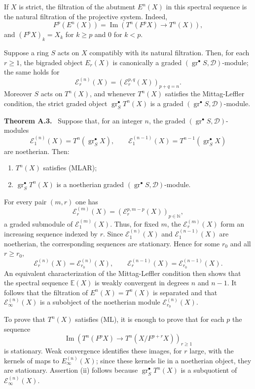 \documentclass[12pt]{article}
\newcommand{\bN}{\mathbb N}
\newcommand{\cD}{\mathcal D}
\newcommand{\cE}{\mathcal E}
\newcommand{\Imn}{\operatorname{Im}}
\newcommand{\gr}{\operatorname{gr}}
\newenvironment{statement}[1]{\par\medskip\noindent\textbf{#1.}\ }{\par\medskip}
\begin{document}
If $X$ is strict, the filtration of the abutment $E^n(X)$ in this spectral sequence
is the natural filtration of the projective system. Indeed,
\[
 F^p(E^n(X))=\Imn(T^n(F^pX)\to T^n(X)),
\]
and $(F^pX)_k=X_k$ for $k\ge p$ and $0$ for $k<p$.

Suppose a ring $S$ acts on $X$ compatibly with its natural filtration. Then, for each
$r\ge1$, the bigraded object $E_r(X)$ is canonically a graded
$(\gr^\bullet S,\cD)$-module; the same holds for
\[
       \cE_r^{(n)}(X)=(\cE_r^{p,q}(X))_{p+q=n}.
\]
Moreover $S$ acts on $T^n(X)$, and whenever $T^n(X)$ satisfies the Mittag-Leffler
condition, the strict graded object $\gr_S^\bullet T^n(X)$ is a graded
$(\gr^\bullet S,\cD)$-module.

\begin{statement}{Theorem A.3}
Suppose that, for an integer $n$, the graded $(\gr^\bullet S,\cD)$-modules
\[
      \cE_1^{(n)}(X)=T^n(\gr_S^\bullet X),
      \qquad
      \cE_1^{(n-1)}(X)=T^{n-1}(\gr_S^\bullet X)
\]
are noetherian. Then:
\begin{enumerate}[label=(\roman*)]
\item $T^n(X)$ satisfies (MLAR);
\item $\gr_S^\bullet T^n(X)$ is a noetherian graded
$(\gr^\bullet S,\cD)$-module.
\end{enumerate}
\end{statement}

For every pair $(m,r)$ one has
\[
      \cE_r^{(m)}(X)=(\cE_r^{p,m-p}(X))_{p\in\bN},
\]
a graded submodule of $\cE_1^{(m)}(X)$. Thus, for fixed $m$, the
$\cE_r^{(m)}(X)$ form an increasing sequence indexed by $r$. Since
$\cE_1^{(n)}(X)$ and $\cE_1^{(n-1)}(X)$ are noetherian, the corresponding sequences
are stationary. Hence for some $r_0$ and all $r\ge r_0$,
\[
 \cE_r^{(n)}(X)=\cE_{r_0}^{(n)}(X),
 \qquad
 \cE_r^{(n-1)}(X)=\cE_{r_0}^{(n-1)}(X).
\]
An equivalent characterization of the Mittag-Leffler condition then shows that the
spectral sequence $\mathbb E(X)$ is weakly convergent in degrees $n$ and $n-1$. It
follows that the filtration of $E^n(X)=T^n(X)$ is separated and that
$\cE_\infty^{(n)}(X)$ is a subobject of the noetherian module
$\cE_{r_0}^{(n)}(X)$.

To prove that $T^n(X)$ satisfies (ML), it is enough to prove that for each $p$ the
sequence
\[
\Imn(T^n(F^pX)\to T^n(X/F^{p+r}X))_{r\ge1}
\]
is stationary. Weak convergence identifies these images, for $r$ large, with the
kernels of maps to $E_\infty^{(n)}(X)$; since these kernels lie in a noetherian
object, they are stationary. Assertion (ii) follows because
$\gr_S^\bullet T^n(X)$ is a subquotient of $\cE_\infty^{(n)}(X)$.
\end{document}

